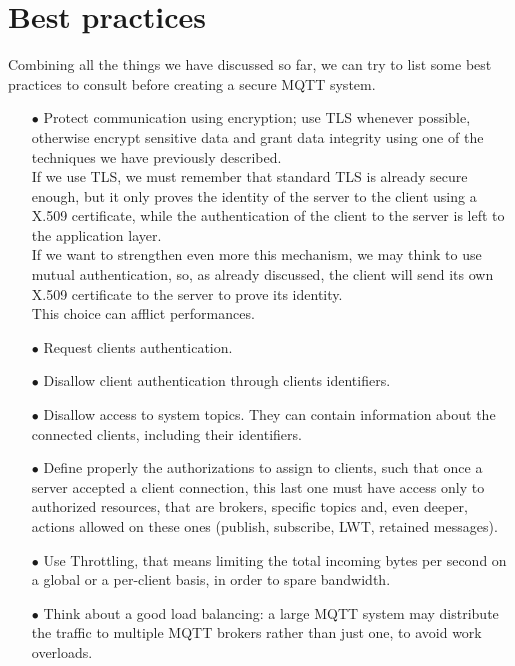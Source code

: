 \documentclass[12pt]{report}
\begin{document}
{{\section{Best practices}
\label{sec:mqttbestpractices}
\bigskip
Combining all the things we have discussed so far, we can try to list some best practices to consult before creating a secure MQTT system.
\bigskip
\begin{itemize}
\setlength{\itemindent}{+4mm}
\item[$\bullet$] Protect communication using encryption; use TLS whenever possible, otherwise encrypt sensitive data and grant data integrity using one of the techniques we have previously described.\\
If we use TLS, we must remember that standard TLS is already secure enough, but it only proves the identity of the server to the client using a X.509 certificate, while the authentication of the client to the server is left to the application layer.\\
If we want to strengthen even more this mechanism, we may think to use mutual authentication, so, as already discussed, the client will send its own X.509 certificate to the server to prove its identity.\\
This choice can afflict performances.
\item[$\bullet$] Request clients authentication.%
\item[$\bullet$] Disallow client authentication through clients identifiers.
\item[$\bullet$] Disallow access to system topics. They can contain information about the connected clients, including their identifiers.
\item[$\bullet$] Define properly the authorizations to assign to clients, such that once a server accepted a client connection, this last one must have access only to authorized resources, that are brokers, specific topics and, even deeper, actions allowed on these ones (publish, subscribe, LWT, retained messages).
\item[$\bullet$] Use Throttling, that means limiting the total incoming bytes per second on a global or a per-client basis, in order to spare bandwidth.
\item[$\bullet$] Think about a good load balancing: a large MQTT system may distribute the traffic to multiple MQTT brokers rather than just one, to avoid work overloads.\\

\end{itemize}}}
\end{document}
